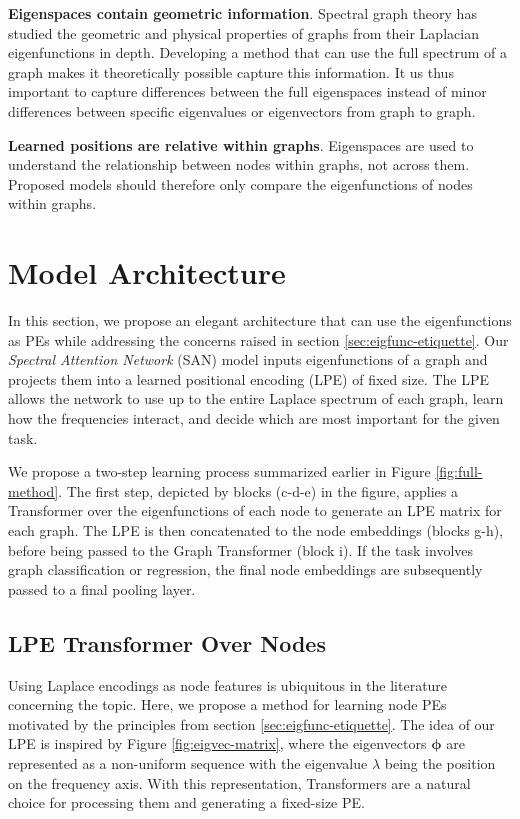 \documentclass{article}
\newcommand{\xhdr}[1]{{\noindent\bfseries #1}.}
\def\eigvec{{\bm{\phi}}}
\begin{document}
\xhdr{Eigenspaces contain geometric information} Spectral graph theory has studied the geometric and physical properties of graphs from their Laplacian eigenfunctions in depth. Developing a method that can use the full spectrum of a graph makes it theoretically possible capture this information. It us thus important to capture differences between the full eigenspaces instead of minor differences between specific eigenvalues or eigenvectors from graph to graph. 

\xhdr{Learned positions are relative within graphs} Eigenspaces are used to understand the relationship between nodes within graphs, not across them. Proposed models should therefore only compare the eigenfunctions of nodes within graphs.




\section{Model Architecture}
\label{sec:architecture}

In this section, we propose an elegant architecture that can use the eigenfunctions as PEs while addressing the concerns raised in section \ref{sec:eigfunc-etiquette}. Our \textit{Spectral Attention Network} (SAN) model inputs eigenfunctions of a graph and projects them into a learned positional encoding (LPE) of fixed size. The LPE allows the network to use up to the entire Laplace spectrum of each graph, learn how the frequencies interact, and decide which are most important for the given task.

We propose a two-step learning process summarized earlier in Figure \ref{fig:full-method}. The first step, depicted by blocks (c-d-e) in the figure, applies a Transformer over the eigenfunctions of each node to generate an LPE matrix for each graph. The LPE is then concatenated to the node embeddings (blocks g-h), before being passed to the Graph Transformer (block i). If the task involves graph classification or regression, the final node embeddings are subsequently passed to a final pooling layer.




\subsection{LPE Transformer Over Nodes}


Using Laplace encodings as node features is ubiquitous in the literature concerning the topic. Here, we propose a method for learning node PEs motivated by the principles from section \ref{sec:eigfunc-etiquette}. 
The idea of our LPE is inspired by Figure \ref{fig:eigvec-matrix}, where the eigenvectors $\eigvec$ are represented as a non-uniform sequence with the eigenvalue $\lambda$ being the position on the frequency axis. With this representation, Transformers are a natural choice for processing them and generating a fixed-size PE.
\end{document}
